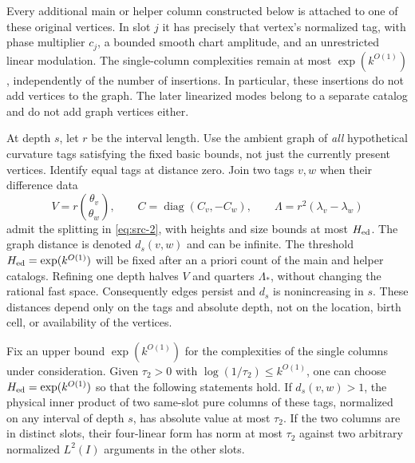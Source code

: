 Every additional main or helper column constructed below is attached to
one of these original vertices.  In slot $j$ it has precisely that vertex's
normalized tag, with phase multiplier $c_j$, a bounded smooth chart
amplitude, and an unrestricted linear modulation.  The single-column
complexities remain at most $\exp(k^{O(1)})$, independently of the number
of insertions.  In particular, these insertions do not add vertices to the
graph.  The later linearized modes belong to a separate catalog and do not
add graph vertices either.

At depth $s$, let $r$ be the interval length.  Use the ambient graph of
\emph{all} hypothetical curvature tags satisfying the fixed basic bounds,
not just the currently present vertices.  Identify equal tags at distance
zero.  Join two tags $v,w$ when their difference data
\[
 V=r\binom{\theta_v}{\theta_w},\qquad
 C=\operatorname{diag}(C_v,-C_w),\qquad
 \Lambda=r^2(\lambda_v-\lambda_w)
\]
admit the splitting in \eqref{eq:src-2}, with heights and size bounds at
most $H_{\rm ed}$.  The graph distance is denoted $d_s(v,w)$ and can be
infinite.  The threshold $H_{\rm ed}=\exp(k^{O(1)})$ will be fixed after
an a priori count of the main and helper catalogs.  Refining one depth
halves $V$ and quarters $\Lambda_*$, without changing the rational fast
space.  Consequently edges persist and $d_s$ is nonincreasing in $s$.
These distances depend only on the tags and absolute depth, not on the
location, birth cell, or availability of the vertices.

\begin{lemma}
\label{lem:tag-separation}
Fix an upper bound $\exp(k^{O(1)})$ for the complexities of the single
columns under consideration.  Given
$\tau_2>0$ with $\log(1/\tau_2)\le k^{O(1)}$, one can choose
$H_{\rm ed}=\exp(k^{O(1)})$ so that the following statements hold.
If $d_s(v,w)>1$, the physical inner product of two same-slot pure columns
of these tags, normalized on any interval of depth $s$, has absolute value
at most $\tau_2$.  If the two columns are in distinct slots, their
four-linear form has norm at most $\tau_2$ against two arbitrary
normalized $L^2(I)$ arguments in the other slots.
\end{lemma}

